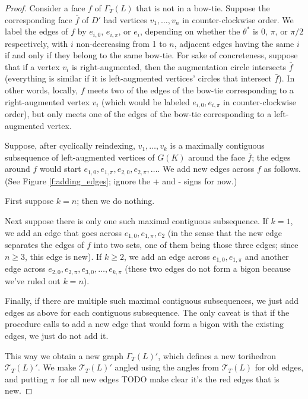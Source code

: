 \documentclass[11pt]{amsart}
\newcommand{\sT}{{\mathcal{T}}}
\theoremstyle{plain}
\theoremstyle{definition}
\begin{document}
\begin{proof}
Consider a face $f$ of $\Gamma_T(L)$ that is not in a bow-tie.
Suppose the corresponding face $\bar{f}$ of $D'$
had vertices $v_1,\ldots,v_n$ in counter-clockwise order.
We label the edges of $f$ by $e_{i,0}$, $e_{i,\pi}$, or $e_i$,
depending on whether the $\theta^*$ is $0$, $\pi$, or $\pi/2$ respectively,
with $i$ non-decreasing from 1 to $n$,
adjacent edges having the same $i$ if and only if they
belong to the same bow-tie.
For sake of concreteness,
suppose that if a vertex $v_i$ is right-augmented,
then the augmentation circle intersects $\bar{f}$
(everything is similar if it is left-augmented vertices' circles
that intersect $\bar{f}$).
In other words, locally, $f$ meets two of the edges of the bow-tie
corresponding to a right-augmented vertex $v_i$
(which would be labeled $e_{i,0}, e_{i,\pi}$ in counter-clockwise order),
but only meets one of the edges of the bow-tie corresponding to
a left-augmented vertex.


Suppose, after cyclically reindexing, $v_1,\ldots,v_k$
is a maximally contiguous subsequence of left-augmented vertices
of $G(K)$ around the face $\bar{f}$;
the edges around $f$ would start
$e_{1,0}, e_{1,\pi}, e_{2,0}, e_{2,\pi}, \ldots$.
We add new edges across $f$ as follows.
(See Figure \ref{f:adding_edges};
ignore the + and - signs for now.)


First suppose $k=n$; then we do nothing.

Next suppose there is only one such maximal contiguous subsequence.
If $k = 1$, we add an edge that goes across
$e_{1,0},e_{1,\pi},e_2$
(in the sense that the new edge separates the edges of $f$ into two sets,
one of them being those three edges;
since $n\geq 3$, this edge is new).
If $k \geq 2$,
we add an edge across $e_{1,0},e_{1,\pi}$
and another edge across $e_{2,0},e_{2,\pi},e_{3,0},\ldots,e_{k,\pi}$
(these two edges do not form a bigon because we've ruled out $k=n$).

Finally, if there are multiple such maximal contiguous subsequences,
we just add edges as above for each contiguous subsequence.
The only caveat is that if the procedure calls to add a new edge
that would form a bigon with the existing edges,
we just do not add it.


This way we obtain a new graph $\Gamma_T(L)'$, which defines a
new torihedron $\sT_T(L)'$.
We make $\sT_T(L)'$ angled using the angles from $\sT_T(L)$ for old edges,
and putting $\pi$ for all new edges TODO make clear it's the red edges that is
new.



\end{proof}
\end{document}
